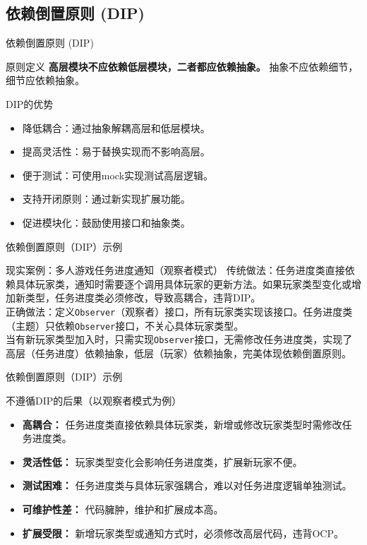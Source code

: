 \documentclass[UTF8,aspectratio=169]{beamer}
\begin{document}
\subsection{依赖倒置原则 (DIP)}

\begin{frame}{依赖倒置原则 (DIP)}
    \begin{ytublock}{原则定义}
        \textbf{高层模块不应依赖低层模块，二者都应依赖抽象。}
        抽象不应依赖细节，细节应依赖抽象。
    \end{ytublock}
    \begin{ytublock}{DIP的优势}
        \begin{itemize}
            \item 降低耦合：通过抽象解耦高层和低层模块。
            \item 提高灵活性：易于替换实现而不影响高层。
            \item 便于测试：可使用mock实现测试高层逻辑。
            \item 支持开闭原则：通过新实现扩展功能。
            \item 促进模块化：鼓励使用接口和抽象类。
        \end{itemize}
    \end{ytublock}
\end{frame}

\begin{frame}{依赖倒置原则（DIP）示例}
    \begin{exampleytublock}{现实案例：多人游戏任务进度通知（观察者模式）}
        传统做法：任务进度类直接依赖具体玩家类，通知时需要逐个调用具体玩家的更新方法。如果玩家类型变化或增加新类型，任务进度类必须修改，导致高耦合，违背DIP。\\
        正确做法：定义\texttt{Observer}（观察者）接口，所有玩家类实现该接口。任务进度类（主题）只依赖\texttt{Observer}接口，不关心具体玩家类型。\\
        当有新玩家类型加入时，只需实现\texttt{Observer}接口，无需修改任务进度类，实现了高层（任务进度）依赖抽象，低层（玩家）依赖抽象，完美体现依赖倒置原则。
    \end{exampleytublock}
\end{frame}

\begin{frame}{依赖倒置原则（DIP）示例}
    \begin{alertytublock}{不遵循DIP的后果（以观察者模式为例）}
        \begin{itemize}
            \item \textbf{高耦合：} 任务进度类直接依赖具体玩家类，新增或修改玩家类型时需修改任务进度类。
            \item \textbf{灵活性低：} 玩家类型变化会影响任务进度类，扩展新玩家不便。
            \item \textbf{测试困难：} 任务进度类与具体玩家强耦合，难以对任务进度逻辑单独测试。
            \item \textbf{可维护性差：} 代码臃肿，维护和扩展成本高。
            \item \textbf{扩展受限：} 新增玩家类型或通知方式时，必须修改高层代码，违背OCP。
        \end{itemize}
    \end{alertytublock}
\end{frame}
\end{document}
